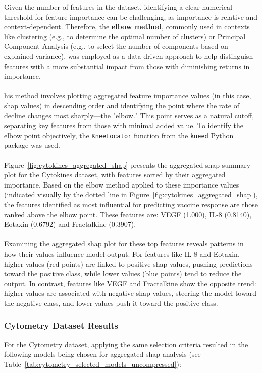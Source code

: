 \documentclass[12pt,a4paper]{report}
\begin{document}
\noindent
Given the number of features in the dataset, identifying a clear numerical threshold for feature importance can be challenging, as importance is relative and context-dependent. Therefore, the \textbf{elbow method}, commonly used in contexts like clustering (e.g., to determine the optimal number of clusters) or Principal Component Analysis (e.g., to select the number of components based on explained variance), was employed as a data-driven approach to help distinguish features with a more substantial impact from those with diminishing returns in importance.\\
\\
his method involves plotting aggregated feature importance values (in this case, \gls{shap} values) in descending order and identifying the point where the rate of decline changes most sharply—the "elbow." This point serves as a natural cutoff, separating key features from those with minimal added value. To identify the elbow point objectively, the \texttt{KneeLocator} function from the \texttt{kneed} Python package was used.\\
\\
Figure~\ref{fig:cytokines_aggregated_shap} presents the aggregated \gls{shap} summary plot for the Cytokines dataset, with features sorted by their aggregated importance. Based on the elbow method applied to these importance values (indicated visually by the dotted line in Figure~\ref{fig:cytokines_aggregated_shap}), the features identified as most influential for predicting vaccine response are those ranked above the elbow point. These features are: VEGF (1.000), IL-8 (0.8140), Eotaxin (0.6792) and Fractalkine (0.3907).\\
\\
Examining the aggregated \gls{shap} plot for these top features reveals patterns in how their values influence model output. For features like IL-8 and Eotaxin, higher values (red points) are linked to positive \gls{shap} values, pushing predictions toward the positive class, while lower values (blue points) tend to reduce the output. In contrast, features like VEGF and Fractalkine show the opposite trend: higher values are associated with negative \gls{shap} values, steering the model toward the negative class, and lower values push it toward the positive class.

\subsubsection*{Cytometry Dataset Results}
For the Cytometry dataset, applying the same selection criteria resulted in the following models being chosen for aggregated \gls{shap} analysis (see Table~\ref{tab:cytometry_selected_models_uncompressed}):\\
\end{document}
